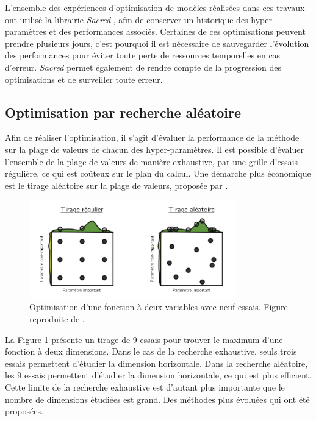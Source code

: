 L'ensemble des expériences d'optimisation de modèles réalisées dans ces travaux ont utilisé la librairie \textit{Sacred} \cite{greff_sacred_2017}, afin de conserver un historique des hyper-paramètres et des performances associés.
Certaines de ces optimisations peuvent prendre plusieurs jours, c'est pourquoi il est nécessaire de sauvegarder l'évolution des performances pour éviter toute perte de ressources temporelles en cas d'erreur.
\textit{Sacred} permet également de rendre compte de la progression des optimisations et de surveiller toute erreur.

\subsection{Optimisation par recherche aléatoire} \label{subsec:random_search}
Afin de réaliser l'optimisation, il s'agit d'évaluer la performance de la méthode sur la plage de valeurs de chacun des hyper-paramètres.
Il est possible d'évaluer l'ensemble de la plage de valeurs de manière exhaustive, par une grille d'essais régulière, ce qui est coûteux sur le plan du calcul.
Une démarche plus économique est le tirage aléatoire sur la plage de valeurs, proposée par \citeauthor{bergstra_random_2012} \cite{bergstra_random_2012}.

\begin{figure}[hbtp]
	\centering
	\includegraphics[width=0.80\textwidth,height=\textheight,keepaspectratio]{../Chap4/Figures/bergstra_RandomSearch2002.png}
	\caption{Optimisation d'une fonction à deux variables avec neuf essais. Figure reproduite de \cite{bergstra_random_2012}.}
	\label{fig:random_search}
\end{figure}

La Figure \ref{fig:random_search} présente un tirage de 9 essais pour trouver le maximum d'une fonction à deux dimensions.
Dans le cas de la recherche exhaustive, seuls trois essais permettent d'étudier la dimension horizontale.
Dans la recherche aléatoire, les 9 essais permettent d'étudier la dimension horizontale, ce qui est plus efficient.
Cette limite de la recherche exhaustive est d'autant plus importante que le nombre de dimensions étudiées est grand.
Des méthodes plus évoluées qui ont été proposées.

